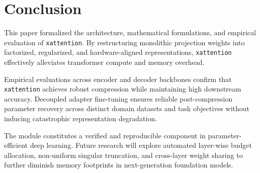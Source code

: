 \section{Conclusion}
This paper formalized the architecture, mathematical formulations, and empirical evaluation of \texttt{xattention}. By restructuring monolithic projection weights into factorized, regularized, and hardware-aligned representations, \texttt{xattention} effectively alleviates transformer compute and memory overhead.

Empirical evaluations across encoder and decoder backbones confirm that \texttt{xattention} achieves robust compression while maintaining high downstream accuracy. Decoupled adapter fine-tuning ensures reliable post-compression parameter recovery across distinct domain datasets and task objectives without inducing catastrophic representation degradation.

The module constitutes a verified and reproducible component in parameter-efficient deep learning. Future research will explore automated layer-wise budget allocation, non-uniform singular truncation, and cross-layer weight sharing to further diminish memory footprints in next-generation foundation models.
